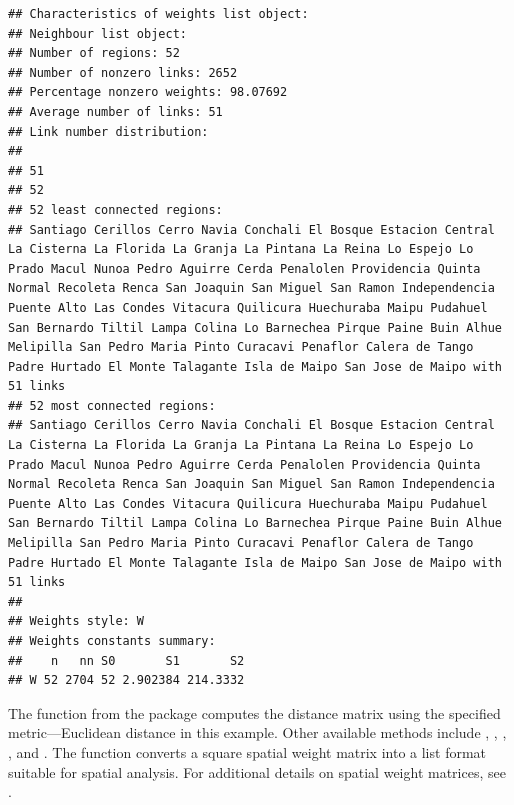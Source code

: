 \begin{knitrout}
\begin{kframe}
\begin{alltt}
 \hlkwb{<-}   \hldef{=} \hldef{,}  \hlopt{$}
\end{alltt}
\begin{verbatim}
## Characteristics of weights list object:
## Neighbour list object:
## Number of regions: 52 
## Number of nonzero links: 2652 
## Percentage nonzero weights: 98.07692 
## Average number of links: 51 
## Link number distribution:
## 
## 51 
## 52 
## 52 least connected regions:
## Santiago Cerillos Cerro Navia Conchali El Bosque Estacion Central La Cisterna La Florida La Granja La Pintana La Reina Lo Espejo Lo Prado Macul Nunoa Pedro Aguirre Cerda Penalolen Providencia Quinta Normal Recoleta Renca San Joaquin San Miguel San Ramon Independencia Puente Alto Las Condes Vitacura Quilicura Huechuraba Maipu Pudahuel San Bernardo Tiltil Lampa Colina Lo Barnechea Pirque Paine Buin Alhue Melipilla San Pedro Maria Pinto Curacavi Penaflor Calera de Tango Padre Hurtado El Monte Talagante Isla de Maipo San Jose de Maipo with 51 links
## 52 most connected regions:
## Santiago Cerillos Cerro Navia Conchali El Bosque Estacion Central La Cisterna La Florida La Granja La Pintana La Reina Lo Espejo Lo Prado Macul Nunoa Pedro Aguirre Cerda Penalolen Providencia Quinta Normal Recoleta Renca San Joaquin San Miguel San Ramon Independencia Puente Alto Las Condes Vitacura Quilicura Huechuraba Maipu Pudahuel San Bernardo Tiltil Lampa Colina Lo Barnechea Pirque Paine Buin Alhue Melipilla San Pedro Maria Pinto Curacavi Penaflor Calera de Tango Padre Hurtado El Monte Talagante Isla de Maipo San Jose de Maipo with 51 links
## 
## Weights style: W 
## Weights constants summary:
##    n   nn S0       S1       S2
## W 52 2704 52 2.902384 214.3332
\end{verbatim}
\end{kframe}
\end{knitrout}

The  function from the  package computes the distance matrix using the specified metric---Euclidean distance in this example. Other available methods include , , , , and . The  function converts a square spatial weight matrix into a list format suitable for spatial analysis. For additional details on spatial weight matrices, see \cite{stewart2010choosing}.

